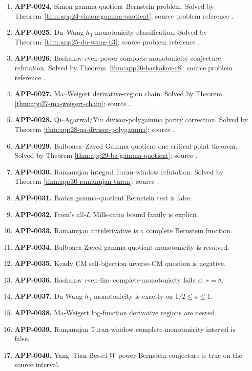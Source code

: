 \documentclass[11pt]{article}
\numberwithin{equation}{section}
\theoremstyle{definition}
\theoremstyle{remark}
\newcommand{\1}{\mathbf 1}
\begin{document}
\begin{enumerate}
\item \textbf{APP-0024.} Simon gamma-quotient Bernstein problem.  Solved by Theorem~\ref{thm:app24-simon-gamma-quotient}; source problem reference \cite{simon-moment}.
\item \textbf{APP-0025.} Du--Wang \(h_3\) monotonicity classification.  Solved by Theorem~\ref{thm:app25-du-wang-h3}; source problem reference \cite{du-wang-h3}.
\item \textbf{APP-0026.} Baskakov even-power complete-monotonicity conjecture refutation.  Solved by Theorem~\ref{thm:app26-baskakov-r8}; source problem reference \cite{abel-gawronski-neuschel}.
\item \textbf{APP-0027.} Ma--Weigert derivative-region chain.  Solved by Theorem \ref{thm:app27-ma-weigert-chain}; source \cite{ma-weigert-log-functions}.
\item \textbf{APP-0028.} Qi--Agarwal/Yin divisor-polygamma parity correction.  Solved by Theorem \ref{thm:app28-qa-divisor-polygamma}; source \cite{qi-agarwal-gamma-ratios}.
\item \textbf{APP-0029.} Bulboaca--Zayed Gamma quotient one-critical-point theorem.  Solved by Theorem \ref{thm:app29-bz-gamma-quotient}; source \cite{bulboaca-zayed-gamma}.
\item \textbf{APP-0030.} Ramanujan integral Turan-window refutation.  Solved by Theorem \ref{thm:app30-ramanujan-turan}; source \cite{mishra-swaminathan-ramanujan}.
\item \textbf{APP-0031.} Baricz gamma-quotient Bernstein test is false.
\item \textbf{APP-0032.} From's all-\(L\) Mills-ratio bound family is explicit.
\item \textbf{APP-0033.} Ramanujan antiderivative is a complete Bernstein function.
\item \textbf{APP-0034.} Bulboaca-Zayed gamma-quotient monotonicity is resolved.
\item \textbf{APP-0035.} Keady CM self-bijection inverse-CM question is negative.
\item \textbf{APP-0036.} Baskakov even-line complete-monotonicity fails at \(r=8\).
\item \textbf{APP-0037.} Du-Wang \(h_3\) monotonicity is exactly on \(1/2\le a\le1\).
\item \textbf{APP-0038.} Ma-Weigert log-function derivative regions are nested.
\item \textbf{APP-0039.} Ramanujan Turan-window complete-monotonicity interval is false.
\item \textbf{APP-0040.} Yang--Tian Bessel-\(W\) power-Bernstein conjecture is true on the source interval.
\end{enumerate}
\end{document}
